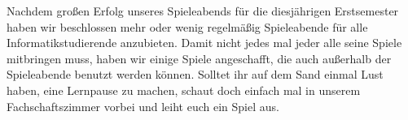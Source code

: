 Nachdem großen Erfolg unseres Spieleabends für die diesjährigen Erstsemester haben wir beschlossen mehr oder wenig regelmäßig Spieleabende für alle Informatikstudierende anzubieten. Damit nicht jedes mal jeder alle seine Spiele mitbringen muss, haben wir einige Spiele angeschafft, die auch außerhalb der Spieleabende benutzt werden können. Solltet ihr auf dem Sand einmal Lust haben, eine Lernpause zu machen, schaut doch einfach mal in unserem Fachschaftszimmer vorbei und leiht euch ein Spiel aus.

